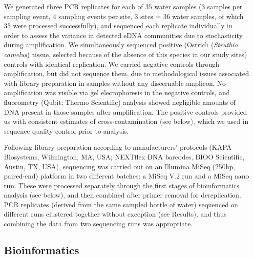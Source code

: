 \documentclass[fleqn,10pt,lineno]{wlpeerj} %
\begin{document}
We generated three PCR replicates for each of 35 water samples (3
samples per sampling event, 4 sampling events per site, 3 sites = 36
water samples, of which 35 were processed successfully), and sequenced
each replicate individually in order to assess the variance in detected
eDNA communities due to stochasticity during amplification. We
simultaneously sequenced positive (Ostrich (\emph{Struthio camelus})
tissue, selected because of the absence of this species in our study
sites) controls with identical replication. We carried negative controls
through amplification, but did not sequence them, due to methodological
issues associated with library preparation in samples without any
discernable amplicon. No amplification was visible via gel
elecrophoresis in the negative controls, and fluorometry (Qubit; Thermo
Scientific) analysis showed negligible amounts of DNA present in those
samples after amplification. The positive controls provided us with
consistent estimates of cross-contamination (see below), which we used
in sequence quality-control prior to analysis.

Following library preparation according to manufacturers' protocols
(KAPA Biosystems, Wilmington, MA, USA; NEXTflex DNA barcodes, BIOO
Scientific, Austin, TX, USA), sequencing was carried out on an Illumina
MiSeq (250bp, paired-end) platform in two different batches: a MiSeq V.2
run and a MiSeq nano run. These were processed separately through the
first stages of bioinformatics analysis (see below), and then combined
after primer removal for dereplication. PCR replicates (derived from the
same sampled bottle of water) sequenced on different runs clustered
together without exception (see Results), and thus combining the data
from two sequencing runs was appropriate.

\subsection{Bioinformatics}\label{bioinformatics}
\end{document}
